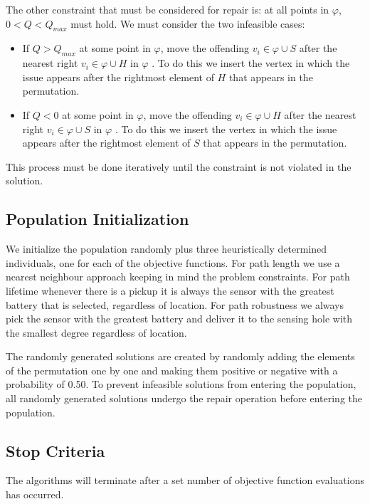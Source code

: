 \documentclass[conference]{IEEEtran}
\begin{document}
The other constraint that must be considered for repair is: at all points in $\varphi$, $0 < Q < Q_{max}$ must hold. We must consider the two infeasible cases:
\begin{itemize}
\item If $Q > Q_{max}$ at some point in $\varphi$, move the offending $v_i \in \varphi \cup S$ after the nearest right $v_i \in \varphi \cup H$ in $\varphi$ . To do this we insert the vertex in which the issue appears after the rightmost element of $H$ that appears in the permutation.

\item If $Q < 0$ at some point in $\varphi$, move the offending $v_i \in \varphi \cup H$ after the nearest right $v_i \in \varphi \cup S$ in $\varphi$ . To do this we insert the vertex in which the issue appears after the rightmost element of $S$ that appears in the permutation.
\end{itemize}

This process must be done iteratively until the constraint is not violated in the solution.

\subsection{Population Initialization}
\label{sec:Algorithms:Initialization}
We initialize the population randomly plus three heuristically determined individuals, one for each of the objective functions. For path length we use a nearest neighbour approach keeping in mind the problem constraints. For path lifetime whenever there is a pickup it is always the sensor with the greatest battery that is selected, regardless of location. For path robustness we always pick the sensor with the greatest battery and deliver it to the sensing hole with the smallest degree regardless of location.

The randomly generated solutions are created by randomly adding the elements of the permutation one by one and making them positive or negative with a probability of 0.50. To prevent infeasible solutions from entering the population, all randomly generated solutions undergo the repair operation before entering the population.

\subsection{Stop Criteria}
\label{sec:Algorithms:StopCriteria}
The algorithms will terminate after a set number of objective function evaluations has occurred.
\end{document}
